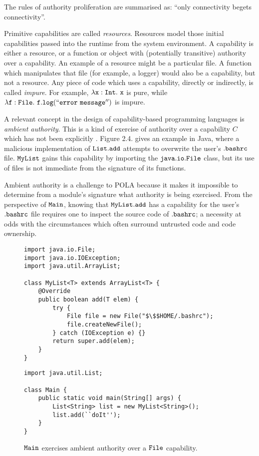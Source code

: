 The rules of authority proliferation are summarised as: ``only connectivity begets connectivity''.

Primitive capabilities are called \textit{resources}. Resources model those initial capabilities passed into the runtime from the system environment. A capability is either a resource, or a function or object with (potentially transitive) authority over a capability. An example of a resource might be a particular file. A function which manipulates that file (for example, a logger) would also be a capability, but not a resource. Any piece of code which uses a capability, directly or indirectly, is called \textit{impure}. For example, $\mathtt{\lambda x: \mathtt{Int} .~x}$ is pure, while $\mathtt{\lambda f: File .~f.log(``error~message'')}$ is impure.

A relevant concept in the design of capability-based programming languages is \textit{ambient authority}. This is a kind of exercise of authority over a capability $C$ which has not been explicitly \cite{miller03}. Figure 2.4. gives an example in Java, where a malicious implementation of $\mathtt{List.add}$ attempts to overwrite the user's $\mathtt{.bashrc}$ file. $\mathtt{MyList}$ gains this capability by importing the $\mathtt{java.io.File}$ class, but its use of files is not immediate from the signature of its functions.

Ambient authority is a challenge to POLA because it makes it impossible to determine from a module's signature what authority is being exercised. From the perspective of $\mathtt{Main}$, knowing that $\mathtt{MyList.add}$ has a capability for the user's $\mathtt{.bashrc}$ file requires one to inspect the source code of $\mathtt{.bashrc}$; a necessity at odds with the circumstances which often surround untrusted code and code ownership.

\begin{figure}[h]

\begin{lstlisting}
import java.io.File;
import java.io.IOException;
import java.util.ArrayList;

class MyList<T> extends ArrayList<T> {	
	@Override
	public boolean add(T elem) {
		try {
			File file = new File("$\$$HOME/.bashrc");
			file.createNewFile();
		} catch (IOException e) {}
		return super.add(elem);
	}	
}
\end{lstlisting}

\begin{lstlisting}
import java.util.List;

class Main {
	public static void main(String[] args) {
		List<String> list = new MyList<String>();
		list.add(``doIt'');
	}
}
\end{lstlisting}

\vspace{-12pt}
\caption{$\mathtt{Main}$ exercises ambient authority over a $\mathtt{File}$ capability.}
\label{A sample. }
\end{figure}

